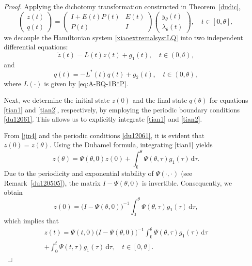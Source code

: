 \documentclass{IEEEtran}
\begin{document}
	\begin{proof}
		Applying the dichotomy transformation constructed in Theorem~\ref{dudic},
		\begin{equation}\label{jin4}
			\begin{pmatrix}z(t)\\ q(t)\end{pmatrix}
			=
			\begin{pmatrix}
				I+E(t)P(t) & E(t)\\[1mm]
				P(t) & I
			\end{pmatrix}
			\begin{pmatrix}y_\theta(t)\\ \lambda_\theta(t)\end{pmatrix},
			\quad t\in[0,\theta],
		\end{equation}
		we decouple the Hamiltonian system \eqref{xiaoextremalsystLQ} into two independent differential equations:
		\begin{equation}\label{tian1}
			\dot z(t) = L(t)z(t) + g_1(t),\quad t\in(0,\theta),
		\end{equation}
		and
		\begin{equation}\label{tian2}
			\dot q(t) = -L^*(t)q(t) + g_2(t),\quad t\in(0,\theta), 
		\end{equation}
		where $L(\cdot)$ is given by \eqref{eq:A-BQ-1B*P}.
		
		Next, we determine the initial state $z(0)$ and the final state $q(\theta)$ for equations \eqref{tian1} and \eqref{tian2}, respectively, by employing the periodic boundary conditions \eqref{du12061}. This allows us to explicitly integrate \eqref{tian1} and \eqref{tian2}.
		
		From \eqref{jin4} and the periodic conditions \eqref{du12061}, it is evident that $z(0)=z(\theta)$. Using the Duhamel formula, integrating \eqref{tian1} yields
		\begin{equation}\label{jin7}
			z(\theta)=\Psi(\theta,0)z(0)+\int_0^\theta \Psi(\theta,\tau)g_1(\tau)\,\mathrm{d}\tau.
		\end{equation}
		Due to the periodicity and exponential stability of $\Psi(\cdot,\cdot)$ (see Remark~\ref{du120505}), the matrix $I-\Psi(\theta,0)$ is invertible. Consequently, we obtain
		\begin{equation*}
			z(0)=\big(I-\Psi(\theta,0)\big)^{-1}\int_0^\theta \Psi(\theta,\tau)g_1(\tau)\,\mathrm{d}\tau,
		\end{equation*}
		which implies that
		\begin{multline*}
			z(t)=\Psi(t,0)\big(I-\Psi(\theta,0)\big)^{-1}\int_0^\theta \Psi(\theta,\tau)g_1(\tau)\,\mathrm{d}\tau\\
			+\int_0^t\Psi(t,\tau)g_1(\tau)\,\mathrm{d}\tau,\quad t \in[0,\theta].
		\end{multline*}
		

\end{proof}
\end{document}
